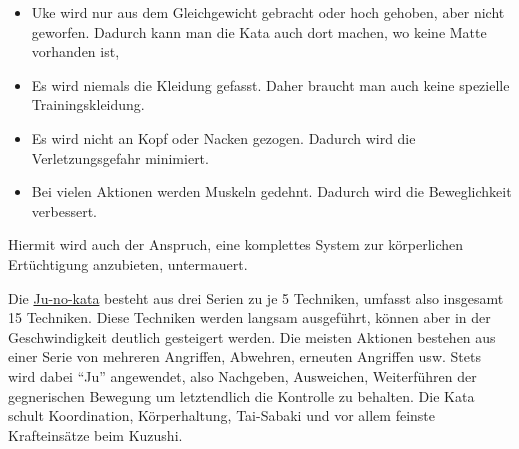 \documentclass[justified, a4paper, notitlepage, captions=tableheading, nobib]{tufte-handout}
\begin{document}
\begin{itemize}
\item Uke wird nur aus dem Gleichgewicht gebracht oder hoch gehoben, aber nicht geworfen. Dadurch kann man die Kata auch dort machen, wo keine Matte vorhanden ist,
\item Es wird niemals die Kleidung gefasst. Daher braucht man auch keine spezielle Trainingskleidung.
\item Es wird nicht an Kopf oder Nacken gezogen. Dadurch wird die Verletzungsgefahr minimiert.
\item Bei vielen Aktionen werden Muskeln gedehnt. Dadurch wird die Beweglichkeit verbessert.
\end{itemize}

Hiermit wird auch der Anspruch, eine komplettes System zur körperlichen Ertüchtigung anzubieten, untermauert.

Die \hyperref[org278cc0e]{Ju-no-kata} besteht aus drei Serien zu je 5 Techniken, umfasst also insgesamt 15 Techniken. 
Diese Techniken werden langsam ausgeführt, können aber in der Geschwindigkeit deutlich gesteigert werden. 
Die meisten Aktionen bestehen aus einer Serie von mehreren Angriffen, Abwehren, erneuten Angriffen usw. 
Stets wird dabei "`Ju"' angewendet, also Nachgeben, Ausweichen, Weiterführen der gegnerischen Bewegung um letztendlich die Kontrolle zu behalten. 
Die Kata schult Koordination, Körperhaltung, Tai-Sabaki und vor allem feinste Krafteinsätze beim Kuzushi.
\end{document}
